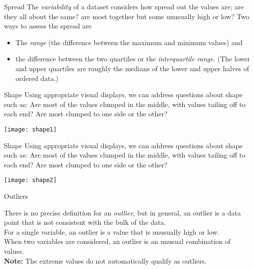 \documentclass[Lecture.tex]{subfiles}
\begin{document}
\begin{frame}{Spread}
The {\it variability} of a dataset considers how spread out the values are; are they all about the same? are most together but some unusually high or low?  Two ways to assess the spread are
\begin{defn}
\begin{itemize}
\item<1->
  The {\it range} (the difference between the maximum and minimum values) and
\item<2->
  the difference between the two quartiles or the {\it interquartile range}. (The lower and upper quartiles are roughly the medians of the lower and upper halves of ordered data.)
\end{itemize}
\end{defn}
\end{frame}

\begin{frame}{Shape}
Using appropriate visual displays, we can address questions about shape such as: Are most of the values clumped in the middle, with values tailing off to each end? Are most clumped to one side or the other?\pause
\begin{center}
\texttt{[image: shape1]}
\end{center}
\end{frame}

\begin{frame}{Shape}
Using appropriate visual displays, we can address questions about shape such as: Are most of the values clumped in the middle, with values tailing off to each end? Are most clumped to one side or the other?
\begin{center}
\texttt{[image: shape2]}
\end{center}
\end{frame}

\begin{frame}{Outliers}
\begin{defn}
There is no precise definition for an {\it outlier}, but in general, an outlier is a data point that is not consistent with the bulk of the data.\\ \pause
For a single variable, an outlier is a value that is unusually high or low.\\ \pause
When two variables are considered, an outlier is an unusual combination of values.\\ \pause
{\bf Note:} The extreme values do not automatically qualify as outliers.
\end{defn}
\end{frame}
\end{document}
